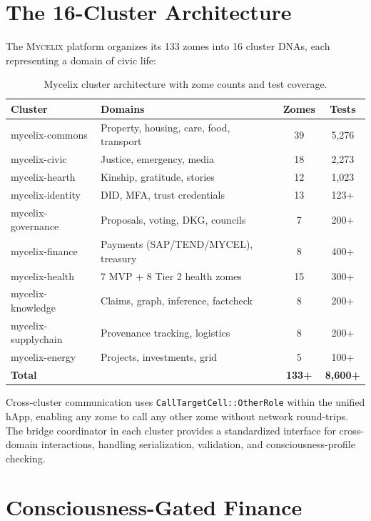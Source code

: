\documentclass[12pt]{book}
\newcommand{\mycelix}{\textsc{Mycelix}}
\begin{document}
\section{The 16-Cluster Architecture}

The \mycelix{} platform organizes its 133 zomes into 16 cluster DNAs, each representing a domain of civic life:

\begin{table}[H]
\centering
\caption{Mycelix cluster architecture with zome counts and test coverage.}
\label{tab:mycelix-clusters}
\begin{tabular}{llcc}
\toprule
\textbf{Cluster} & \textbf{Domains} & \textbf{Zomes} & \textbf{Tests} \\
\midrule
mycelix-commons & Property, housing, care, food, transport & 39 & 5,276 \\
mycelix-civic & Justice, emergency, media & 18 & 2,273 \\
mycelix-hearth & Kinship, gratitude, stories & 12 & 1,023 \\
mycelix-identity & DID, MFA, trust credentials & 13 & 123+ \\
mycelix-governance & Proposals, voting, DKG, councils & 7 & 200+ \\
mycelix-finance & Payments (SAP/TEND/MYCEL), treasury & 8 & 400+ \\
mycelix-health & 7 MVP + 8 Tier 2 health zomes & 15 & 300+ \\
mycelix-knowledge & Claims, graph, inference, factcheck & 8 & 200+ \\
mycelix-supplychain & Provenance tracking, logistics & 8 & 200+ \\
mycelix-energy & Projects, investments, grid & 5 & 100+ \\
\midrule
\textbf{Total} & & \textbf{133+} & \textbf{8,600+} \\
\bottomrule
\end{tabular}
\end{table}

Cross-cluster communication uses \texttt{CallTargetCell::OtherRole} within the unified hApp, enabling any zome to call any other zome without network round-trips. The bridge coordinator in each cluster provides a standardized interface for cross-domain interactions, handling serialization, validation, and consciousness-profile checking.

\section{Consciousness-Gated Finance}
\end{document}
